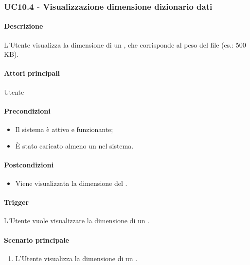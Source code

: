 
\subsubsection{UC10.4 - Visualizzazione dimensione dizionario dati}\label{UC10point4}
\paragraph*{Descrizione}
L'Utente visualizza la dimensione di un , che corrisponde al peso del file (es.: 500 KB).

\paragraph*{Attori principali}
Utente

\paragraph*{Precondizioni}
\begin{itemize}
  \item Il sistema è attivo e funzionante;
  \item È stato caricato almeno un  nel sistema. 
\end{itemize}

\paragraph*{Postcondizioni}
\begin{itemize}
  \item Viene visualizzata la dimensione del .
\end{itemize}

\paragraph*{Trigger}
L'Utente vuole visualizzare la dimensione di un .

\paragraph*{Scenario principale}
\begin{enumerate}
  \item L'Utente visualizza la dimensione di un .
\end{enumerate}

